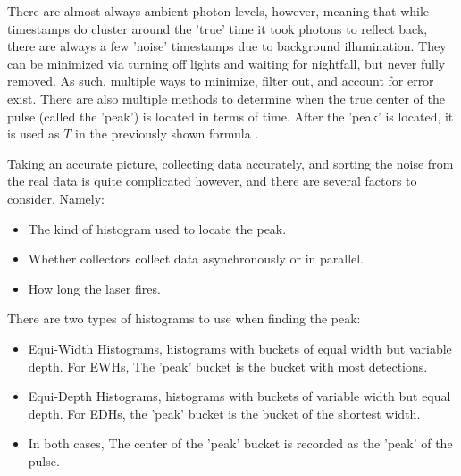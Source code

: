 \documentclass[aspectratio=169]{beamer}
\begin{document}
\begin{frame}  
  There are almost always ambient photon levels, however, meaning that while timestamps do cluster around the 'true' time it took photons to reflect back, there are always a few 'noise' timestamps due to background illumination. They can be minimized via turning off lights and waiting for nightfall, but never fully removed. As such, multiple ways to minimize, filter out, and account for error exist. There are also multiple methods to determine when the true center of the pulse (called the 'peak') is located in terms of time. After the 'peak' is located, it is used as $T$ in the previously shown formula \cite{sadekar}.
\end{frame}

\begin{frame}
  Taking an accurate picture, collecting data accurately, and sorting the noise from the real data is quite complicated however, and there are several factors to consider. Namely:
  \begin{itemize}
    \color{Blue}
  \item The kind of histogram used to locate the peak.
  \item Whether collectors collect data asynchronously or in parallel.
  \item How long the laser fires.
  \end{itemize}
\end{frame}

\begin{frame}  
  There are two types of histograms to use when finding the peak: \cite{sadekar}
  \begin{itemize}
    \color{Blue}
  \item Equi-Width Histograms, histograms with buckets of equal width but variable depth. For EWHs, The 'peak' bucket is the bucket with most detections.
  \item Equi-Depth Histograms, histograms with buckets of variable width but equal depth. For EDHs, the 'peak' bucket is the bucket of the shortest width.
  \item In both cases, The center of the 'peak' bucket is recorded as the 'peak' of the pulse.
  \end{itemize}
\end{frame}
\end{document}
